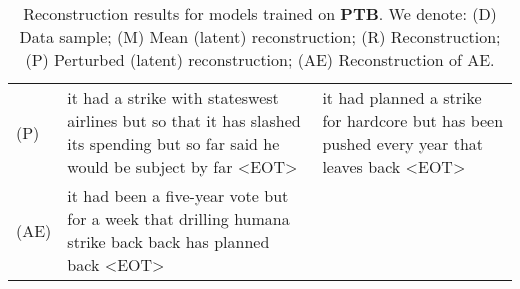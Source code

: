 \documentclass{article}
\begin{document}
\begin{table}[th]
{\begin{tabular}{l| p{8cm}|p{8cm} }
\hdashline[1pt/1pt]
(P) & it had a strike with stateswest airlines but so that it has slashed its spending but so far said he would be subject by far \textsc{<EOT>} & it had planned a strike for hardcore but has been pushed every year that leaves back \textsc{<EOT>} \\
\hdashline[1pt/1pt]
(AE) & it had been a five-year vote but for a week that drilling humana strike back back has planned back \textsc{<EOT>} &  \\
    \end{tabular}
    }
    \caption{
    Reconstruction results for models trained on \textbf{PTB}.
    We denote:
    (D) Data sample; 
    (M) Mean (latent) reconstruction;
    (R) Reconstruction;
    (P) Perturbed (latent) reconstruction;
    (AE) Reconstruction of AE.
    }
    \label{tab:nlp-recon-ptb-1}
\end{table}
\end{document}
